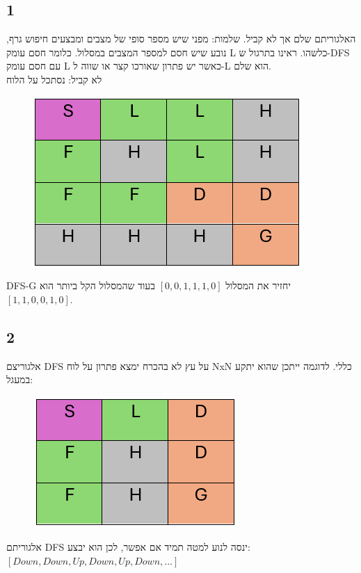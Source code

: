\documentclass{article}
\begin{document}
\subsection*{1}
האלגוריתם שלם אך לא קביל.
שלמות: מפני שיש מספר סופי של מצבים ומבצעים חיפוש גרף, נובע שיש חסם למספר המצבים במסלול. כלומר חסם עומק L כלשהו. ראינו בתרגול ש-DFS עם חסם עומק L כאשר יש פתרון שאורכו קצר או שווה ל-L הוא שלם.\\
לא קביל:  נסתכל על הלוח
\begin{figure}[H]
	\includegraphics[scale=0.5]{3_1}
\end{figure}
DFS-G
יחזיר את המסלול 
$[0, 0, 1, 1, 1, 0]$
בעוד שהמסלול הקל ביותר הוא
$[1, 1, 0, 0, 1, 0]$.
\subsection*{2}
אלגוריצם DFS על עץ לא בהכרח ימצא פתרון על לוח NxN כללי. לדוגמה ייתכן שהוא יתקע במעגל:
\begin{figure}[H]
	\includegraphics[scale=0.5]{3_2}
\end{figure}
אלגוריתם DFS ינסה לנוע למטה תמיד אם אפשר, לכן הוא יבצע:
$[Down,Down, Up, Down, Up, Down, ...]$
\end{document}
